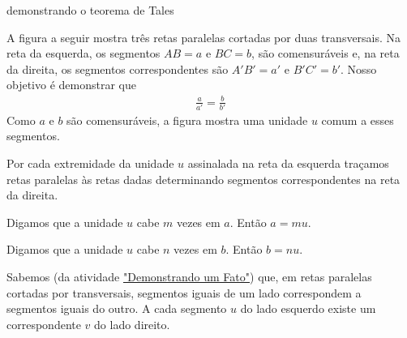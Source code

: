 \begin{task}{demonstrando o teorema de Tales}

A figura a seguir mostra três retas paralelas cortadas por duas transversais. Na reta da esquerda, os segmentos \(AB = a\) e \(BC = b\), são comensuráveis e, na reta da direita, os segmentos correspondentes são \(A'B' = a'\) e \(B'C' = b'\).
Nosso objetivo é demonstrar que
\begin{equation*}
\begin{split}\frac{a}{a'}=\frac{b}{b'}\end{split}
\end{equation*}
Como \(a\) e \(b\) são comensuráveis, a figura mostra uma unidade \(u\) comum a esses segmentos.

Por cada extremidade da unidade \(u\) assinalada na reta da esquerda traçamos retas paralelas às retas dadas determinando segmentos correspondentes na reta da direita.

Digamos que a unidade \(u\) cabe \(m\) vezes em \(a\). Então \(a = mu\).

Digamos que a unidade \(u\) cabe \(n\) vezes em \(b\). Então \(b = nu\).

Sabemos (da atividade \hyperref[demonstrando-afirmacao]{"Demonstrando um Fato"}) que, em retas paralelas cortadas por transversais, segmentos iguais de um lado correspondem a segmentos iguais do outro. A cada segmento \(u\) do lado esquerdo existe um correspondente \(v\) do lado direito.



\end{task}
